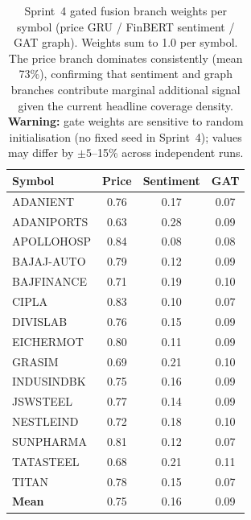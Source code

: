 \begin{table}[htbp]
\centering
\caption{%
  Sprint~4 gated fusion branch weights per symbol (price GRU /
  FinBERT sentiment / GAT graph). Weights sum to 1.0 per symbol.
  The price branch dominates consistently (mean 73\%), confirming
  that sentiment and graph branches contribute marginal additional
  signal given the current headline coverage density.
  \textbf{Warning:} gate weights are sensitive to random initialisation
  (no fixed seed in Sprint~4); values may differ by $\pm 5$--15\%
  across independent runs.
}
\label{tab:gate_weights}
\setlength{\tabcolsep}{8pt}
\begin{tabular}{l
  S[table-format=1.2]
  S[table-format=1.2]
  S[table-format=1.2]}
\toprule
\textbf{Symbol} &
  {\textbf{Price}} &
  {\textbf{Sentiment}} &
  {\textbf{GAT}} \\
\midrule
ADANIENT   & 0.76 & 0.17 & 0.07 \\
ADANIPORTS & 0.63 & 0.28 & 0.09 \\
APOLLOHOSP & 0.84 & 0.08 & 0.08 \\
BAJAJ-AUTO & 0.79 & 0.12 & 0.09 \\
BAJFINANCE & 0.71 & 0.19 & 0.10 \\
CIPLA      & 0.83 & 0.10 & 0.07 \\
DIVISLAB   & 0.76 & 0.15 & 0.09 \\
EICHERMOT  & 0.80 & 0.11 & 0.09 \\
GRASIM     & 0.69 & 0.21 & 0.10 \\
INDUSINDBK & 0.75 & 0.16 & 0.09 \\
JSWSTEEL   & 0.77 & 0.14 & 0.09 \\
NESTLEIND  & 0.72 & 0.18 & 0.10 \\
SUNPHARMA  & 0.81 & 0.12 & 0.07 \\
TATASTEEL  & 0.68 & 0.21 & 0.11 \\
TITAN      & 0.78 & 0.15 & 0.07 \\
\midrule
\textbf{Mean} & 0.75 & 0.16 & 0.09 \\
\bottomrule
\end{tabular}
\end{table}

